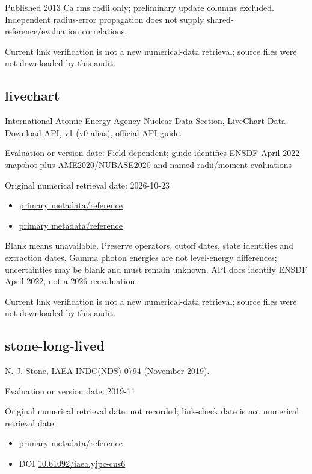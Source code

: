 \documentclass[
  11pt,
  letterpaper,
]{article}
\providecommand{\tightlist}{%
  \setlength{\itemsep}{0pt}\setlength{\parskip}{0pt}}
\begin{document}
Published 2013 Ca rms radii only; preliminary update columns excluded.
Independent radius-error propagation does not supply
shared-reference/evaluation correlations.

Current link verification is not a new numerical-data retrieval; source
files were not downloaded by this audit.

\subsection{livechart}\label{livechart}

International Atomic Energy Agency Nuclear Data Section, LiveChart Data
Download API, v1 (v0 alias), official API guide.

Evaluation or version date: Field-dependent; guide identifies ENSDF
April 2022 snapshot plus AME2020/NUBASE2020 and named radii/moment
evaluations

Original numerical retrieval date: 2026-10-23

\begin{itemize}
\tightlist
\item
  \href{https://www-nds.iaea.org/relnsd/vcharthtml/api_v0_guide.html}{primary
  metadata/reference}
\item
  \href{https://nds.iaea.org/relnsd/v1/data}{primary metadata/reference}
\end{itemize}

Blank means unavailable. Preserve operators, cutoff dates, state
identities and extraction dates. Gamma photon energies are not
level-energy differences; uncertainties may be blank and must remain
unknown. API docs identify ENSDF April 2022, not a 2026 reevaluation.

Current link verification is not a new numerical-data retrieval; source
files were not downloaded by this audit.

\subsection{stone-long-lived}\label{stone-long-lived}

N. J. Stone, IAEA INDC(NDS)-0794 (November 2019).

Evaluation or version date: 2019-11

Original numerical retrieval date: not recorded; link-check date is not
numerical retrieval date

\begin{itemize}
\tightlist
\item
  \href{https://nds.iaea.org/records/x2773-kj397}{primary
  metadata/reference}
\item
  DOI
  \href{https://doi.org/10.61092/iaea.yjpc-cns6}{10.61092/iaea.yjpc-cns6}
\end{itemize}
\end{document}
